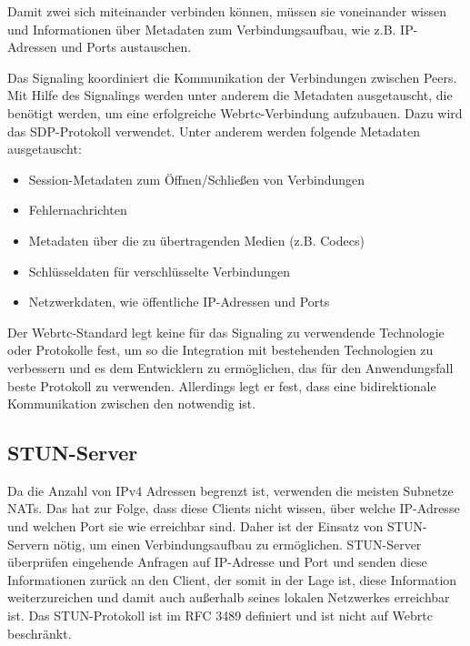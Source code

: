 Damit zwei \clients sich miteinander verbinden können, müssen sie voneinander wissen und Informationen über Metadaten zum Verbindungsaufbau, wie z.B. IP-Adressen und Ports austauschen.

Das Signaling koordiniert die Kommunikation der Verbindungen zwischen Peers. Mit Hilfe des Signalings werden unter anderem die Metadaten ausgetauscht, die benötigt werden, um eine erfolgreiche Webrtc-Verbindung aufzubauen. Dazu wird das SDP-Protokoll verwendet. Unter anderem werden folgende Metadaten ausgetauscht\cite{html5-rocks-signaling}:

\begin{itemize}
	\item Session-Metadaten zum Öffnen/Schließen von Verbindungen
	\item Fehlernachrichten
	\item Metadaten über die zu übertragenden Medien (z.B. Codecs)
	\item Schlüsseldaten für verschlüsselte Verbindungen
	\item Netzwerkdaten, wie öffentliche IP-Adressen und Ports
\end{itemize} 

Der Webrtc-Standard legt keine für das Signaling zu verwendende Technologie oder Protokolle fest, um so die Integration mit bestehenden Technologien zu verbessern und es dem Entwicklern zu ermöglichen, das für den Anwendungsfall beste Protokoll zu verwenden. Allerdings legt er fest, dass eine bidirektionale Kommunikation zwischen den \clients notwendig ist.

%
\subsection{STUN-Server}

Da die Anzahl von IPv4 Adressen begrenzt ist, verwenden die meisten Subnetze NATs. Das hat zur Folge, dass diese Clients nicht wissen, über welche IP-Adresse und welchen Port sie wie erreichbar sind. Daher ist der Einsatz von STUN-Servern nötig, um einen Verbindungsaufbau zu ermöglichen. STUN-Server überprüfen eingehende Anfragen auf IP-Adresse und Port und senden diese Informationen zurück an den Client, der somit in der Lage ist, diese Information weiterzureichen und damit auch außerhalb seines lokalen Netzwerkes erreichbar ist. Das STUN-Protokoll ist im RFC 3489\cite{rfcStun} definiert und ist nicht auf Webrtc beschränkt.


